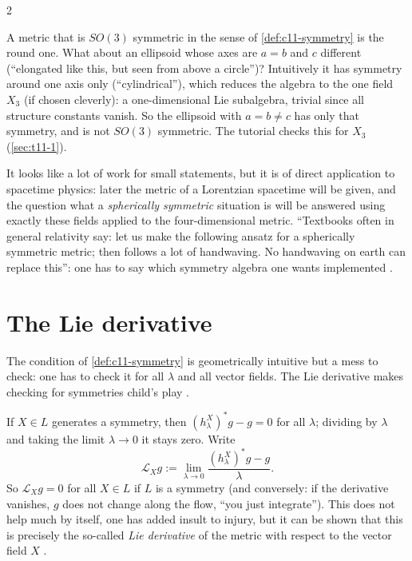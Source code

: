 \begin{paracol}{2}
\begin{example}\label{ex:c11-ellipsoid}
A metric that is $SO(3)$ symmetric in the sense of \cref{def:c11-symmetry} is the round one. What about an ellipsoid whose axes are $a=b$ and $c$ different (``elongated like this, but seen from above a circle'')? Intuitively it has symmetry around one axis only (``cylindrical''), which reduces the algebra to the one field $X_3$ (if chosen cleverly): a one-dimensional Lie subalgebra, trivial since all structure constants vanish. So the ellipsoid with $a=b\neq c$ has only that symmetry, and is not $SO(3)$ symmetric. The tutorial checks this for $X_3$ (\cref{sec:t11-1}).
\end{example}
\begin{aside}
It looks like a lot of work for small statements, but it is of direct application to spacetime physics: later the metric of a Lorentzian spacetime will be given, and the question what a \emph{spherically symmetric} situation is will be answered using exactly these fields applied to the four-dimensional metric. ``Textbooks often in general relativity say: let us make the following ansatz for a spherically symmetric metric; then follows a lot of handwaving. No handwaving on earth can replace this'': one has to say which symmetry algebra one wants implemented .
\end{aside}

\section{The Lie derivative}\label{sec:c11-lieder}

The condition of \cref{def:c11-symmetry} is geometrically intuitive but a mess to check: one has to check it for all $\lambda$ and all vector fields. The Lie derivative makes checking for symmetries child's play .

If $X\in L$ generates a symmetry, then $(h^X_\lambda)^*g-g=0$ for all $\lambda$; dividing by $\lambda$ and taking the limit $\lambda\to0$ it stays zero. Write
\[
  \mathcal L_Xg:=\lim_{\lambda\to0}\frac{(h^X_\lambda)^*g-g}{\lambda}.
\]
So $\mathcal L_Xg=0$ for all $X\in L$ if $L$ is a symmetry (and conversely: if the derivative vanishes, $g$ does not change along the flow, ``you just integrate''). This does not help much by itself, one has added insult to injury, but it can be shown that this is precisely the so-called \emph{Lie derivative} of the metric with respect to the vector field $X$ .


\end{paracol}
